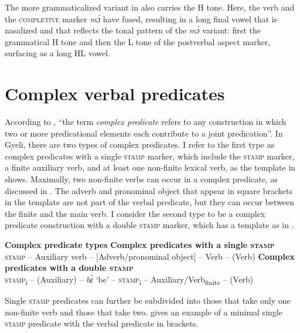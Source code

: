 \noindent The more grammaticalized variant in  also carries the H tone. Here, the verb and the \textsc{completive} marker {\itshape mɔ̀} have fused, resulting in a  long final vowel that is nasalized and that reflects the tonal pattern of the {\itshape mɔ̀} variant: first the grammatical H tone and then the L tone of the postverbal aspect marker, surfacing as a long HL vowel.
















\section{Complex verbal predicates}
\label{sec:CompPred}

According to \citet[50]{butt2010}, ``the term {\itshape complex predicate} refers to any construction in which two or more predicational elements each contribute to a joint predication''. 
In Gyeli, there are two types of complex predicates. I refer to the first type as complex predicates with a single \textsc{stamp} marker, which include the \textsc{stamp} marker, a finite auxiliary verb, and at least one non-finite lexical verb, as the template in  shows. Maximally, two non-finite verbs can occur in a complex predicate, as discussed in . The adverb and pronominal object that appear in square brackets in the template are not part of the verbal predicate, but they can occur between the finite and the main verb.  I consider the second type to be a complex predicate construction with a double \textsc{stamp} marker, which has a template as in .


\ea\label{CompTemp}  {\bfseries Complex predicate types}
\ea  \label{CompTemp1} {\bfseries Complex predicates with a single \textsc{stamp}}  \\
\textsc{stamp} -- Auxiliary verb -- [Adverb/pronominal object] -- Verb -- (Verb)
\ex\label{CompTemp2} {\bfseries Complex predicates with a double \textsc{stamp}} \\
\textsc{stamp}\textsubscript{i} -- (Auxiliary) -- {\itshape bɛ̀} `be' -- \textsc{stamp}\textsubscript{i} -- Auxiliary/Verb\textsubscript{finite} -- (Verb)
\z
\z

Single \textsc{stamp} predicates can further be subdivided into those that take only one non-finite verb and those that take two.  gives an example of a minimal single \textsc{stamp} predicate with the verbal predicate in brackets.

